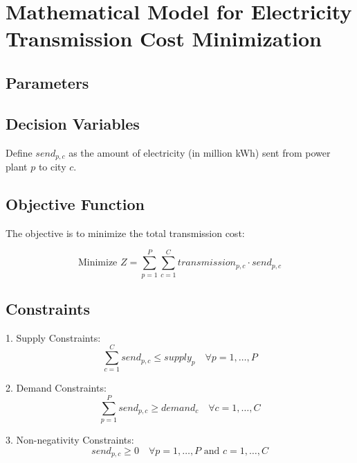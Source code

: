 \documentclass{article}
\begin{document}
\section*{Mathematical Model for Electricity Transmission Cost Minimization}

\subsection*{Parameters}

\subsection*{Decision Variables}
Define $send_{p,c}$ as the amount of electricity (in million kWh) sent from power plant $p$ to city $c$.

\subsection*{Objective Function}
The objective is to minimize the total transmission cost:

\[
\text{Minimize } Z = \sum_{p=1}^{P} \sum_{c=1}^{C} transmission_{p,c} \cdot send_{p,c}
\]

\subsection*{Constraints}
1. Supply Constraints:
\[
\sum_{c=1}^{C} send_{p,c} \leq supply_{p} \quad \forall p = 1, \ldots, P
\]

2. Demand Constraints:
\[
\sum_{p=1}^{P} send_{p,c} \geq demand_{c} \quad \forall c = 1, \ldots, C
\]

3. Non-negativity Constraints:
\[
send_{p,c} \geq 0 \quad \forall p = 1, \ldots, P \text{ and } c = 1, \ldots, C
\]
\end{document}
